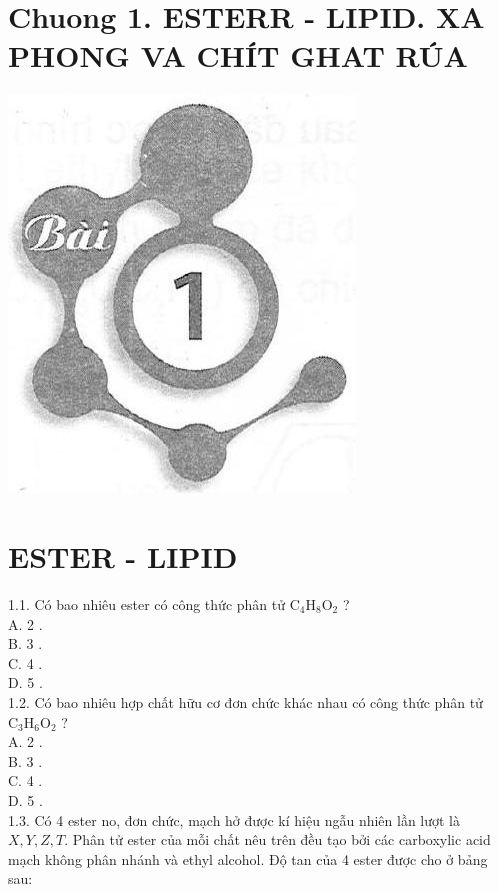 \documentclass[10pt]{article}
\begin{document}
\captionsetup{singlelinecheck=false}
\section*{Chuong 1. ESTERR - LIPID. XA PHONG VA CHÍT GHAT RÚA}
\begin{center}
\includegraphics[max width=\textwidth]{2025_10_23_de6f5713836e4e91b3c8g-001}
\end{center}

\section*{ESTER - LIPID}
1.1. Có bao nhiêu ester có công thức phân tử $\mathrm{C}_{4} \mathrm{H}_{8} \mathrm{O}_{2}$ ?\\
A. 2 .\\
B. 3 .\\
C. 4 .\\
D. 5 .\\
1.2. Có bao nhiêu hợp chất hữu cơ đơn chức khác nhau có công thức phân tử $\mathrm{C}_{3} \mathrm{H}_{6} \mathrm{O}_{2}$ ?\\
A. 2 .\\
B. 3 .\\
C. 4 .\\
D. 5 .\\
1.3. Có 4 ester no, đơn chức, mạch hở được kí hiệu ngẫu nhiên lần lượt là $X, Y, Z, T$. Phân tử ester của mỗi chất nêu trên đều tạo bởi các carboxylic acid mạch không phân nhánh và ethyl alcohol. Độ tan của 4 ester được cho ở bảng sau:
\end{document}
